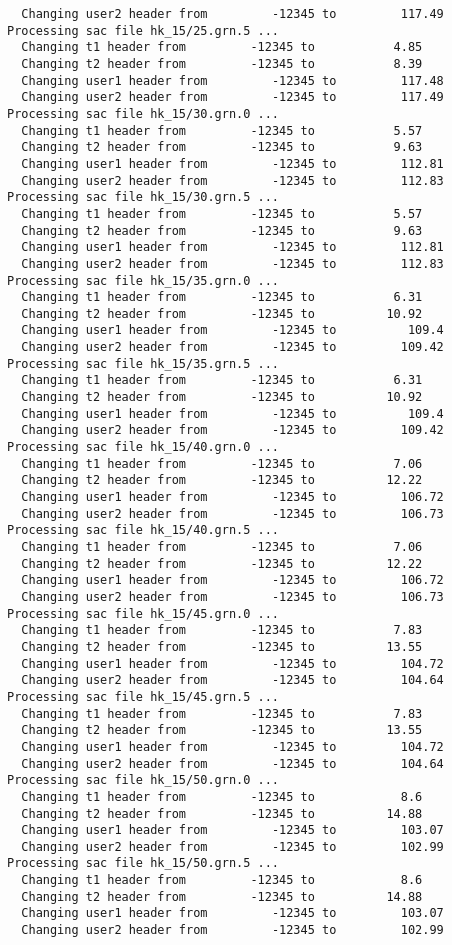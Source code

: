 \documentclass[11pt,titlepage,fleqn]{article}
\begin{document}
\begin{enumerate}
\begin{verbatim}
  Changing user2 header from         -12345 to         117.49
Processing sac file hk_15/25.grn.5 ...
  Changing t1 header from         -12345 to           4.85
  Changing t2 header from         -12345 to           8.39
  Changing user1 header from         -12345 to         117.48
  Changing user2 header from         -12345 to         117.49
Processing sac file hk_15/30.grn.0 ...
  Changing t1 header from         -12345 to           5.57
  Changing t2 header from         -12345 to           9.63
  Changing user1 header from         -12345 to         112.81
  Changing user2 header from         -12345 to         112.83
Processing sac file hk_15/30.grn.5 ...
  Changing t1 header from         -12345 to           5.57
  Changing t2 header from         -12345 to           9.63
  Changing user1 header from         -12345 to         112.81
  Changing user2 header from         -12345 to         112.83
Processing sac file hk_15/35.grn.0 ...
  Changing t1 header from         -12345 to           6.31
  Changing t2 header from         -12345 to          10.92
  Changing user1 header from         -12345 to          109.4
  Changing user2 header from         -12345 to         109.42
Processing sac file hk_15/35.grn.5 ...
  Changing t1 header from         -12345 to           6.31
  Changing t2 header from         -12345 to          10.92
  Changing user1 header from         -12345 to          109.4
  Changing user2 header from         -12345 to         109.42
Processing sac file hk_15/40.grn.0 ...
  Changing t1 header from         -12345 to           7.06
  Changing t2 header from         -12345 to          12.22
  Changing user1 header from         -12345 to         106.72
  Changing user2 header from         -12345 to         106.73
Processing sac file hk_15/40.grn.5 ...
  Changing t1 header from         -12345 to           7.06
  Changing t2 header from         -12345 to          12.22
  Changing user1 header from         -12345 to         106.72
  Changing user2 header from         -12345 to         106.73
Processing sac file hk_15/45.grn.0 ...
  Changing t1 header from         -12345 to           7.83
  Changing t2 header from         -12345 to          13.55
  Changing user1 header from         -12345 to         104.72
  Changing user2 header from         -12345 to         104.64
Processing sac file hk_15/45.grn.5 ...
  Changing t1 header from         -12345 to           7.83
  Changing t2 header from         -12345 to          13.55
  Changing user1 header from         -12345 to         104.72
  Changing user2 header from         -12345 to         104.64
Processing sac file hk_15/50.grn.0 ...
  Changing t1 header from         -12345 to            8.6
  Changing t2 header from         -12345 to          14.88
  Changing user1 header from         -12345 to         103.07
  Changing user2 header from         -12345 to         102.99
Processing sac file hk_15/50.grn.5 ...
  Changing t1 header from         -12345 to            8.6
  Changing t2 header from         -12345 to          14.88
  Changing user1 header from         -12345 to         103.07
  Changing user2 header from         -12345 to         102.99
\end{verbatim}


\end{enumerate}
\end{document}
